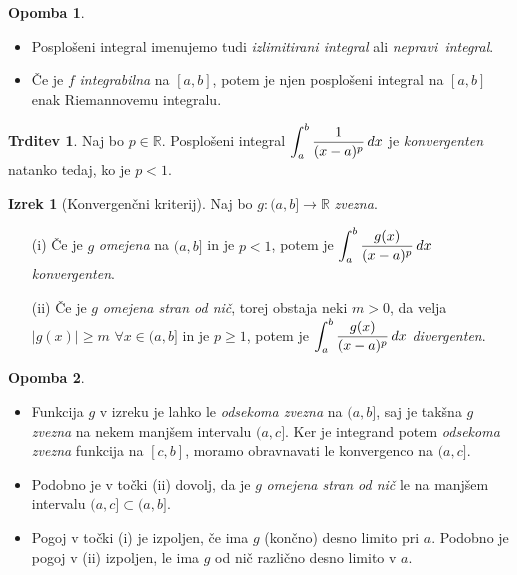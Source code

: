\documentclass[11pt]{article}
\theoremstyle{definition}
\theoremstyle{definition}
\newtheorem{trditev}{Trditev}[section]
\theoremstyle{definition}
\newtheorem{izrek}{Izrek}[section]
\theoremstyle{theorem}
\newtheorem*{opomba}{Opomba}
\begin{document}
\begin{opomba}
~
\begin{itemize}
	
	\item Posplošeni integral imenujemo tudi \textit{izlimitirani integral} ali \hbox{\textit{nepravi integral}}.
	
	\item Če je $f$ \textit{integrabilna} na $[a, b]$, potem je njen posplošeni integral na $[a, b]$ enak Riemannovemu integralu.	
	
\end{itemize}
\end{opomba}
\vspace{0.5cm}

\begin{trditev}

Naj bo $p \in \mathbb{R}$. Posplošeni integral $\mathlarger{\int_a^b \frac{1}{(x-a)^p}\,dx}$ je \hbox{\textit{konvergenten}} natanko tedaj, ko je $p<1$.

\end{trditev}
\vspace{0.5cm}

\begin{izrek}[Konvergenčni kriterij]

Naj bo $g:(a, b] \rightarrow \mathbb{R}$ \textit{zvezna}.
\begin{enumerate}
		
	\item[(i)] Če je $g$ \textit{omejena} na $(a, b]$ in je $p<1$, potem je $\mathlarger{\int_a^b \frac{g(x)}{(x-a)^p}\,dx}$ \hbox{\textit{konvergenten}}.
	
	\item[(ii)] Če je $g$ \textit{omejena stran od nič}, torej obstaja neki $m > 0$, da velja $|g(x)| \geq m$ $\forall x \in (a, b]$ in je $p \geq 1$, potem je $\mathlarger{\int_a^b \frac{g(x)}{(x-a)^p}\,dx}$ \textit{divergenten}.		
		
\end{enumerate}
\end{izrek}
\vspace{0.5cm}

\begin{opomba}
~
\begin{itemize}

	\item Funkcija $g$ v izreku je lahko le \textit{odsekoma zvezna} na $(a, b]$, saj je takšna $g$ \textit{zvezna} na nekem manjšem intervalu $(a, c]$. Ker je integrand potem \textit{odsekoma zvezna} funkcija na $[c, b]$, moramo obravnavati le konvergenco na $(a, c]$.
	
	\item Podobno je v točki (ii) dovolj, da je $g$ \textit{omejena stran od nič} le na manjšem intervalu $(a, c] \subset (a, b]$.
	
	\item Pogoj v točki (i) je izpoljen, če ima $g$ (končno) desno limito pri $a$. Podobno je pogoj v (ii) izpoljen, le ima $g$ od nič različno desno limito v $a$.

\end{itemize}
\end{opomba}
\vspace{0.5cm}
\end{document}
